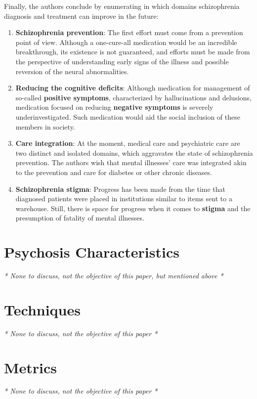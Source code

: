 \documentclass{Paper_Summary}
\begin{document}
    Finally, the authors conclude by enumerating in which domains schizophrenia diagnosis and treatment can improve in the future:
    \begin{enumerate}
        \item \textbf{Schizophrenia prevention}: The first effort must come from a prevention point of view. Although a one-cure-all medication would be an incredible breakthrough, its existence is not guaranteed, and efforts must be made from the perspective of understanding early signs of the illness and possible reversion of the neural abnormalities.
        \item \textbf{Reducing the cognitive deficits}: Although medication for management of so-called \textbf{positive symptoms}, characterized by hallucinations and delusions, medication focused on reducing \textbf{negative symptoms} is severely underinvestigated. Such medication would aid the social inclusion of these members in society.
        \item \textbf{Care integration}: At the moment, medical care and psychiatric care are two distinct and isolated domains, which aggravates the state of schizophrenia prevention. The authors wish that mental illnesses' care was integrated akin to the prevention and care for diabetes or other chronic diseases.
        \item \textbf{Schizophrenia stigma}: Progress has been made from the time that diagnosed patients were placed in institutions similar to items sent to a warehouse. Still, there is space for progress when it comes to \textbf{stigma} and the presumption of fatality of mental illnesses.
    \end{enumerate} 

\breakline

\newpage

\section{Psychosis Characteristics}
\emph{* None to discuss, not the objective of this paper, but mentioned above *}

\section{Techniques}
\emph{* None to discuss, not the objective of this paper *}

\section{Metrics}
\emph{* None to discuss, not the objective of this paper *}
\end{document}
